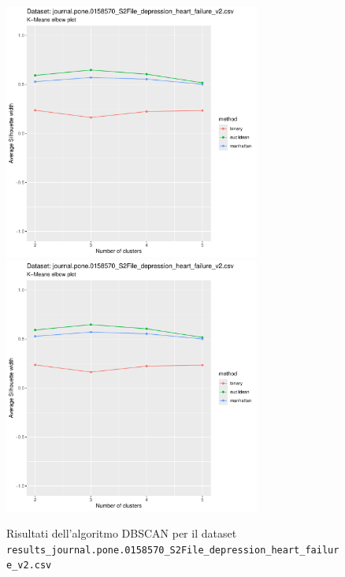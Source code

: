 \documentclass[12pt]{report}
\begin{document}
			\begin{figure}[h]
				\centering
				\includegraphics[width = 0.75\textwidth, height = 0.45\textheight, page = 5]{
					results/results_journal.pone.0158570_S2File_depression_heart_failure_v2.csv.pdf
				}
				\includegraphics[width = 0.75\textwidth, height = 0.45\textheight, page = 6]{
					results/results_journal.pone.0158570_S2File_depression_heart_failure_v2.csv.pdf
				}
				\caption{Risultati dell'algoritmo DBSCAN per il dataset
				\texttt{results\_journal.pone.0158570\_S2File\_depression\_heart\_failure\_v2.csv}}
				\label{fig:dbscan1}
			\end{figure}
\end{document}
